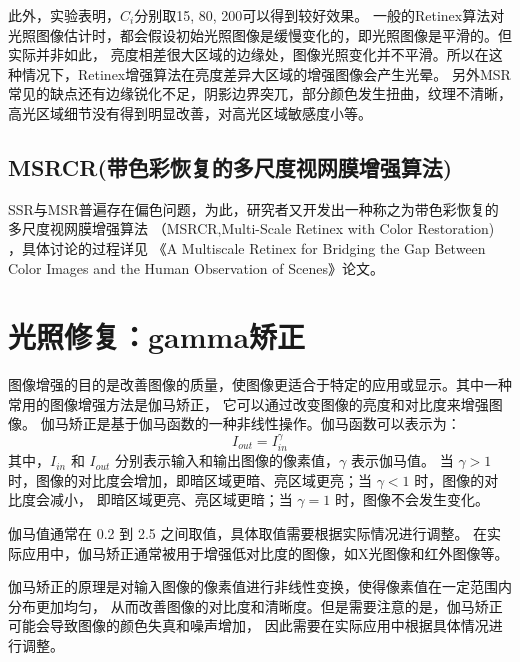 \documentclass[lang=cn,newtx,10pt,scheme=chinese]{elegantbook}
\begin{document}
    此外，实验表明，$C_i$分别取15, 80, 200可以得到较好效果。
    一般的Retinex算法对光照图像估计时，都会假设初始光照图像是缓慢变化的，即光照图像是平滑的。但实际并非如此，
    亮度相差很大区域的边缘处，图像光照变化并不平滑。所以在这种情况下，Retinex增强算法在亮度差异大区域的增强图像会产生光晕。
    另外MSR常见的缺点还有边缘锐化不足，阴影边界突兀，部分颜色发生扭曲，纹理不清晰，高光区域细节没有得到明显改善，对高光区域敏感度小等。
    
    \subsection{MSRCR(带色彩恢复的多尺度视网膜增强算法)}\label{subsec:msrcr()}
    SSR与MSR普遍存在偏色问题，为此，研究者又开发出一种称之为带色彩恢复的多尺度视网膜增强算法
    （MSRCR,Multi-Scale Retinex with Color Restoration) ，具体讨论的过程详见
    《A Multiscale Retinex for Bridging the Gap Between Color Images and the Human Observation of Scenes》论文。

    \section{光照修复：gamma矫正}\label{sec::gama}
    图像增强的目的是改善图像的质量，使图像更适合于特定的应用或显示。其中一种常用的图像增强方法是伽马矫正，
    它可以通过改变图像的亮度和对比度来增强图像。
    伽马矫正是基于伽马函数的一种非线性操作。伽马函数可以表示为：
    \begin{equation}
        I_{out} = I_{in}^\gamma\label{eq:equation2-5}
    \end{equation}
    其中，$I_{in}$ 和 $I_{out}$ 分别表示输入和输出图像的像素值，$\gamma$ 表示伽马值。
    当 $\gamma > 1$ 时，图像的对比度会增加，即暗区域更暗、亮区域更亮；当 $\gamma < 1$ 时，图像的对比度会减小，
    即暗区域更亮、亮区域更暗；当 $\gamma = 1$ 时，图像不会发生变化。

    伽马值通常在 0.2 到 2.5 之间取值，具体取值需要根据实际情况进行调整。
    在实际应用中，伽马矫正通常被用于增强低对比度的图像，如X光图像和红外图像等。

    伽马矫正的原理是对输入图像的像素值进行非线性变换，使得像素值在一定范围内分布更加均匀，
    从而改善图像的对比度和清晰度。但是需要注意的是，伽马矫正可能会导致图像的颜色失真和噪声增加，
    因此需要在实际应用中根据具体情况进行调整。
\end{document}

